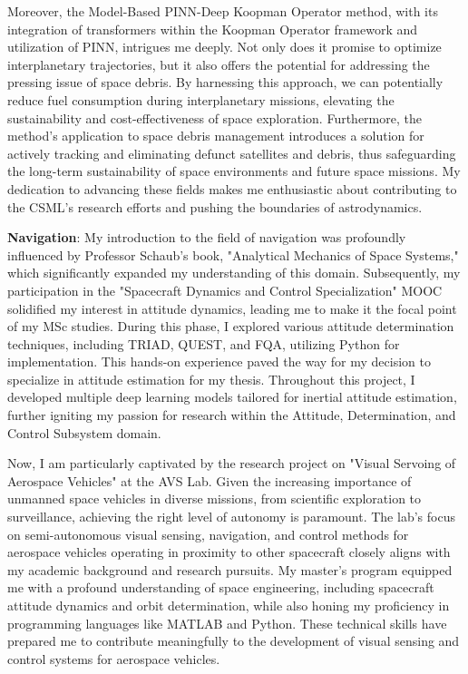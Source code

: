 \documentclass[a4,20pt]{article}
\begin{document}
\begin{large}
Moreover, the Model-Based PINN-Deep Koopman Operator method, with its integration of transformers within the Koopman Operator framework and utilization of PINN, intrigues me deeply. Not only does it promise to optimize interplanetary trajectories, but it also offers the potential for addressing the pressing issue of space debris. By harnessing this approach, we can potentially reduce fuel consumption during interplanetary missions, elevating the sustainability and cost-effectiveness of space exploration. Furthermore, the method's application to space debris management introduces a solution for actively tracking and eliminating defunct satellites and debris, thus safeguarding the long-term sustainability of space environments and future space missions. My dedication to advancing these fields makes me enthusiastic about contributing to the CSML's research efforts and pushing the boundaries of astrodynamics.\vspace{-0.25cm}


\textbf{Navigation}: My introduction to the field of navigation was profoundly influenced by Professor Schaub's book, "Analytical Mechanics of Space Systems," which significantly expanded my understanding of this domain. Subsequently, my participation in the "Spacecraft Dynamics and Control Specialization" MOOC solidified my interest in attitude dynamics, leading me to make it the focal point of my MSc studies. During this phase, I explored various attitude determination techniques, including TRIAD, QUEST, and FQA, utilizing Python for implementation. This hands-on experience paved the way for my decision to specialize in attitude estimation for my thesis. Throughout this project, I developed multiple deep learning models tailored for inertial attitude estimation, further igniting my passion for research within the Attitude, Determination, and Control Subsystem domain. \vspace{-0.35cm}

Now, I am particularly captivated by the research project on "Visual Servoing of Aerospace Vehicles" at the AVS Lab. Given the increasing importance of unmanned space vehicles in diverse missions, from scientific exploration to surveillance, achieving the right level of autonomy is paramount. The lab's focus on semi-autonomous visual sensing, navigation, and control methods for aerospace vehicles operating in proximity to other spacecraft closely aligns with my academic background and research pursuits. My master's program equipped me with a profound understanding of space engineering, including spacecraft attitude dynamics and orbit determination, while also honing my proficiency in programming languages like MATLAB and Python. These technical skills have prepared me to contribute meaningfully to the development of visual sensing and control systems for aerospace vehicles. \vspace{-0.35cm}


\end{large}
\end{document}
